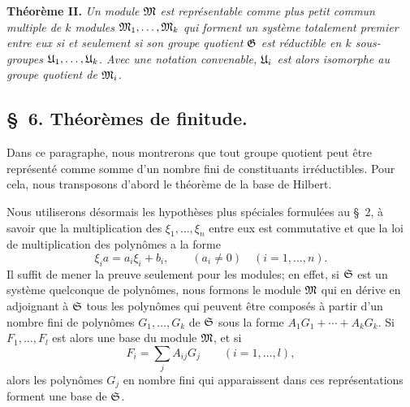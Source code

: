 \textbf{Théorème II.} \emph{Un module $\mathfrak{M}$ est représentable comme plus petit commun multiple de $k$ modules $\mathfrak{M}_1,\ldots,\mathfrak{M}_k$ qui forment un système totalement premier entre eux si et seulement si son groupe quotient $\mathfrak{G}$ est réductible en $k$ sous-groupes $\mathfrak{U}_1,\ldots,\mathfrak{U}_k$. Avec une notation convenable, $\mathfrak{U}_i$ est alors isomorphe au groupe quotient de $\mathfrak{M}_i$.}

\subsection*{\S~6. Théorèmes de finitude.}

Dans ce paragraphe, nous montrerons que tout groupe quotient peut être représenté comme somme d'un nombre fini de constituants irréductibles. Pour cela, nous transposons d'abord le théorème de la base de Hilbert.

Nous utiliserons désormais les hypothèses plus spéciales formulées au \S~2, à savoir que la multiplication des $\xi_1,\ldots,\xi_n$ entre eux est commutative et que la loi de multiplication des polynômes a la forme
\begin{equation}
 \xi_i a=a_i\xi_i+b_i,
 \qquad (a_i\ne0)\quad(i=1,\ldots,n).
\tag{6}
\end{equation}
Il suffit de mener la preuve seulement pour les modules; en effet, si $\mathfrak{S}$ est un système quelconque de polynômes, nous formons le module $\mathfrak{M}$ qui en dérive en adjoignant à $\mathfrak{S}$ tous les polynômes qui peuvent être composés à partir d'un nombre fini de polynômes $G_1,\ldots,G_k$ de $\mathfrak{S}$ sous la forme $A_1G_1+\cdots+A_kG_k$. Si $F_1,\ldots,F_l$ est alors une base du module $\mathfrak{M}$, et si
\[
 F_i=\sum_j A_{ij}G_j\qquad(i=1,\ldots,l),
\]
alors les polynômes $G_j$ en nombre fini qui apparaissent dans ces représentations forment une base de $\mathfrak{S}$.

